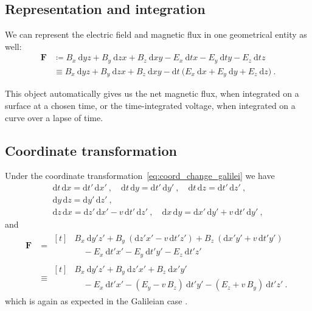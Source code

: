 \documentclass[\ifafour a4paper,12pt,\else a5paper,10pt,\fi%
onecolumn,oneside,article,%
british%
]{memoir}
\theoremstyle{remark}
\theoremstyle{innote}
\newcommand*{\di}{\mathrm{d}}%
\newcommand*{\defd}{\coloneqq}
\renewcommand*{\|}[1][]{\nonscript\:#1\vert\nonscript\:\mathopen{}}
\newcommand*{\eqn}{eq.}%
\begin{document}
\subsection{Representation and integration}
\label{sec:em_repres}

We can represent the electric field and magnetic flux in one geometrical entity as well:
\begin{equation}
  \label{eq:Faraday}
  \begin{split}
    \bm{F} &\defd
    B_{x}\ \di yz + B_{y}\ \di zx + B_{z}\ \di xy
  - E_{x}\ \di tx - E_{y}\ \di ty - E_{z}\ \di tz
    \\
    &\equiv
    B_{x}\ \di yz + B_{y}\ \di zx + B_{z}\ \di xy -
    \di t\ \bigl(E_{x}\ \di x + E_{y}\ \di y + E_{z}\ \di z \bigr)\ .
\end{split}
\end{equation}

This object automatically gives us the net magnetic flux, when integrated on a surface at a chosen time, or the time-integrated voltage, when integrated on a curve over a lapse of time. 

\subsection{Coordinate transformation}
\label{sec:em_coords}

Under the coordinate transformation~\eqref{eq:coord_change_galilei} we have
\begin{equation}
  \label{eq:transf_2form_galilei}
  \begin{gathered}
    \di t\,\di x = \di t'\,\di x' \ ,\quad
    \di t\,\di y = \di t'\,\di y' \ ,\quad
    \di t\,\di z = \di t'\,\di z' \ ,
    \\
    \di y\,\di z = \di y'\,\di z' \ ,\\
    \di z\,\di x = \di z'\,\di x' - v\,\di t'\,\di z'\ ,\quad
    \di x\,\di y = \di x'\,\di y' + v\,\di t'\,\di y' \ ,
  \end{gathered}
\end{equation}
and
\begin{equation}
  \label{eq:transf_faraday}
  \begin{split}
    \bm{F} &= 
    \!\begin{aligned}[t]
    &B_{x}\ \di y'z' + B_{y}\ (\di z'x' - v\,\di t'z')
    + B_{z}\ (\di x'y' + v\,\di t'y') \\
    &\quad {}- E_{x}\ \di t'x' - E_{y}\ \di t'y' - E_{z}\ \di t'z'
  \end{aligned}
  \\
    &\equiv
    \!\begin{aligned}[t]
    &B_{x}\ \di y'z' + B_{y}\ \di z'x' + B_{z}\ \di x'y' \\
    &\quad {} - E_{x}\ \di t'x' 
   - (E_{y} - v\,B_{z})\ \di t'y' - (E_{z} + v\,B_{y})\ \di t'z' \ .
  \end{aligned}
\end{split}
\end{equation}
which is again as expected in the Galileian case \autocites[\eqn~(11.3)]{kovetz2000}.
\end{document}
